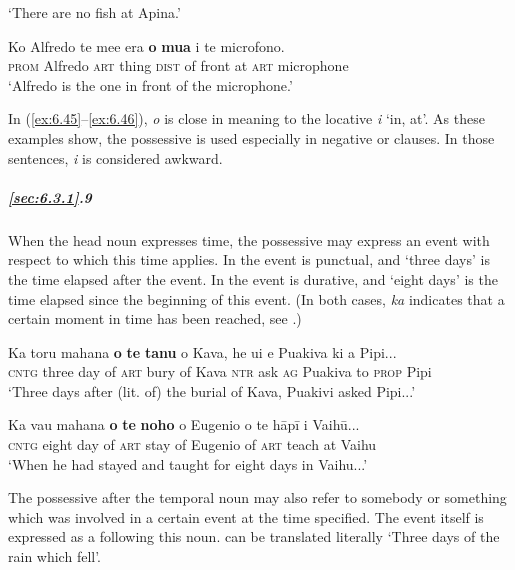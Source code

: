 \glt 
‘There are no fish at Apina.’ \textstyleExampleref{[R301.292]} 
\z

\ea\label{ex:6.46}
\gll Ko Alfredo te me{\ꞌ}e era \textbf{o} \textbf{mu{\ꞌ}a} i te microfono. \\
\textsc{prom} Alfredo \textsc{art} thing \textsc{dist} of front at \textsc{art} microphone \\

\glt
‘Alfredo is the one in front of the microphone.’ \textstyleExampleref{[R415.600]} 
\z

In (\ref{ex:6.45}–\ref{ex:6.46}), \textit{o} is close in meaning to the locative \textit{{\ꞌ}i} ‘in, at’. As these examples show, the possessive is used especially in negative or  clauses. In those sentences, \textit{{\ꞌ}i} is considered awkward.

\subparagraph{\ref{sec:6.3.1}.9} When the head noun expresses time, the possessive may express an event with respect to which this time applies. In  the event is punctual, and ‘three days’ is the time elapsed after the event. In  the event is durative, and ‘eight days’ is the time elapsed since the beginning of this event. (In both cases, \textit{ka} indicates that a certain moment in time has been reached, see .)

\ea\label{ex:6.47}
\gll Ka toru mahana \textbf{o} \textbf{te} \textbf{tanu} o Kava, he {\ꞌ}ui e Puakiva ki a Pipi... \\
\textsc{cntg} three day of \textsc{art} bury of Kava \textsc{ntr} ask \textsc{ag} Puakiva to \textsc{prop} Pipi \\

\glt 
‘Three days after (lit. of) the burial of Kava, Puakivi asked Pipi...’ \textstyleExampleref{[R229.358]} 
\z

\ea\label{ex:6.48}
\gll Ka va{\ꞌ}u mahana \textbf{o} \textbf{te} \textbf{noho} o Eugenio o te hāpī {\ꞌ}i Vaihū... \\
\textsc{cntg} eight day of \textsc{art} stay of Eugenio of \textsc{art} teach at Vaihu \\

\glt
‘When he had stayed and taught for eight days in Vaihu...’ \textstyleExampleref{[R231.203]} 
\z

The possessive after the temporal noun may also refer to somebody or something which was involved in a certain event at the time specified. The event itself is expressed as a  following this noun.  can be translated literally ‘Three days of the rain which fell’.


